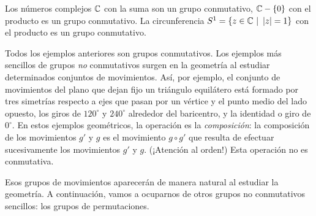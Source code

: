 \begin{example}
    Los números complejos $\mathbb{C}$ con la suma son un grupo conmutativo, $\mathbb{C} - \left\lbrace0\right\rbrace$ con el producto es un grupo conmutativo. La circunferencia $S^1=\set{z\in\CC \ | \ \abs{z}=1}$ con el producto es un grupo conmutativo.
\end{example}

\begin{example}
    Todos los ejemplos anteriores son grupos conmutativos. Los ejemplos más sencillos de grupos {\it no} conmutativos surgen en la geometría al estudiar determinados conjuntos de movimientos. Así, por ejemplo, el conjunto de movimientos del plano que dejan fijo un triángulo equilátero está formado por tres simetrías respecto a ejes que pasan por un vértice y el punto medio del lado opuesto, los giros de $120^\circ$ y $240^\circ$ alrededor del baricentro, y la identidad o giro de $0^\circ$. En estos ejemplos geométricos, la operación es la {\it composición}: la composición de los movimientos $g'$ y $g$ es el movimiento $g\circ g'$ que resulta de efectuar sucesivamente los movimientos $g'$ y $g$. (¡Atención al orden!) Esta operación no es conmutativa.

    Esos grupos de movimientos aparecerán de manera natural al estudiar la geometría. A continuación, vamos a ocuparnos de otros grupos no conmutativos sencillos: los grupos de permutaciones.
\end{example}
